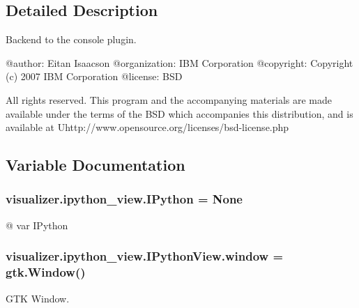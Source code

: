 \subsection{Detailed Description}
\begin{DoxyVerb}Backend to the console plugin.

@author: Eitan Isaacson
@organization: IBM Corporation
@copyright: Copyright (c) 2007 IBM Corporation
@license: BSD

All rights reserved. This program and the accompanying materials are made 
available under the terms of the BSD which accompanies this distribution, and 
is available at U{http://www.opensource.org/licenses/bsd-license.php}
\end{DoxyVerb}
 

\subsection{Variable Documentation}
\subsubsection[{\texorpdfstring{I\+Python}{IPython}}]{\setlength{\rightskip}{0pt plus 5cm}visualizer.\+ipython\+\_\+view.\+I\+Python = None}\hypertarget{namespacevisualizer_1_1ipython__view_a225279206f657edad064bf30c7d69b84}{}\label{namespacevisualizer_1_1ipython__view_a225279206f657edad064bf30c7d69b84}


@ var I\+Python 

\subsubsection[{\texorpdfstring{window}{window}}]{\setlength{\rightskip}{0pt plus 5cm}visualizer.\+ipython\+\_\+view.\+I\+Python\+View.\+window = gtk.\+Window()}\hypertarget{namespacevisualizer_1_1ipython__view_ae2c349e0d13465bcd100c8bad952117f}{}\label{namespacevisualizer_1_1ipython__view_ae2c349e0d13465bcd100c8bad952117f}


G\+TK Window. 

